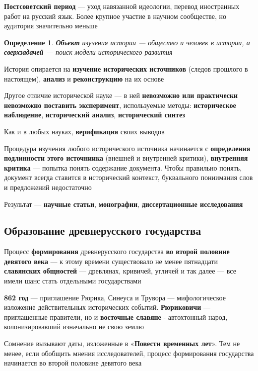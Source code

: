 \documentclass{article}
\newtheorem{definition}{Определение}
\begin{document}
\hfill

\textbf{Постсоветский период} — уход навязанной идеологии, перевод иностранных работ на русский язык. Более крупное участие в научном сообществе, но аудитория значительно меньше

\begin{definition}
    \textbf{Объект} изучения истории — общество и человек в истории, а \textbf{сверхзадачей} — поиск модели исторического развития
\end{definition}

История опирается на \textbf{изучение исторических источников} (следов прошлого в настоящем), \textbf{анализ} и \textbf{реконструкцию} на их основе

Другое отличие исторической науке — в ней \textbf{невозможно или практически невозможно поставить эксперимент}, используемые методы: \textbf{историческое наблюдение}, \textbf{исторический анализ}, \textbf{исторический синтез}

Как и в любых науках, \textbf{верификация} своих выводов

\hfill

Процедура изучения любого исторического источника начинается с \textbf{определения подлинности этого источниика} (внешней и внутренней критики), \textbf{внутренняя критика} — попытка понять содержание документа. Чтобы правильно понять, документ всегда ставится в исторический контекст, буквального пониимания слов и предложений недостаточно

Результат — \textbf{научные статьи}, \textbf{монографии}, \textbf{диссертационные исследования}

\subsection{Образование древнерусского государства}

Процесс \textbf{формирования} древнерусского государства \textbf{во второй половине девятого века} — к этому времени существовало не менее пятнадцати \textbf{славянских общностей} — древлянах, кривичей, угличей и так далее — все имели шанс стать отдельными государствами

\textbf{862 год} — приглашение Рюрика, Синеуса и Трувора — мифологическое изложение действительных исторических событий. \textbf{Рюриковичи} — приглашенные правители, но и \textbf{восточные славяне} - автохтонный народ, колонизировавший изначально не свою землю

Сомнение вызывают даты, изложенные в «\textbf{Повести временных лет}». Тем не менее, если обобщить мнения исследователей, процесс формирования государства начинается во второй половине девятого века
\end{document}
